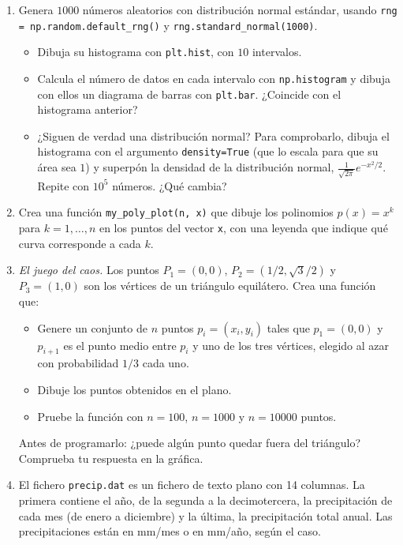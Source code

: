 \begin{enumerate}
\item Genera $1000$ números aleatorios con distribución normal estándar, usando \texttt{rng = np.random.default\_rng()} y \texttt{rng.standard\_normal(1000)}.
\begin{itemize}
    \item Dibuja su histograma con \texttt{plt.hist}, con $10$ intervalos.
    \item Calcula el número de datos en cada intervalo con \texttt{np.histogram} y dibuja con ellos un diagrama de barras con \texttt{plt.bar}. ¿Coincide con el histograma anterior?
    \item ¿Siguen de verdad una distribución normal? Para comprobarlo, dibuja el histograma con el argumento \texttt{density=True} (que lo escala para que su área sea $1$) y superpón la densidad de la distribución normal, $\frac{1}{\sqrt{2\pi}}e^{-x^2/2}$. Repite con $10^5$ números. ¿Qué cambia?
\end{itemize}

\item Crea una función \texttt{my\_poly\_plot(n, x)} que dibuje los polinomios $p(x)=x^k$ para $k=1,\ldots,n$ en los puntos del vector \texttt{x}, con una leyenda que indique qué curva corresponde a cada $k$.

\item \emph{El juego del caos.} Los puntos $P_1=(0,0)$, $P_2=(1/2,\sqrt{3}/2)$ y $P_3=(1,0)$ son los vértices de un triángulo equilátero. Crea una función que:
\begin{itemize}
    \item Genere un conjunto de $n$ puntos $p_i=(x_i,y_i)$ tales que $p_1=(0,0)$ y $p_{i+1}$ es el punto medio entre $p_i$ y uno de los tres vértices, elegido al azar con probabilidad $1/3$ cada uno.
    \item Dibuje los puntos obtenidos en el plano.
    \item Pruebe la función con $n=100$, $n=1000$ y $n=10000$ puntos.
\end{itemize}
Antes de programarlo: ¿puede algún punto quedar fuera del triángulo? Comprueba tu respuesta en la gráfica.

\item\label{ej:precip} El fichero \texttt{precip.dat} es un fichero de texto plano con 14 columnas. La primera contiene el año, de la segunda a la decimotercera, la precipitación de cada mes (de enero a diciembre) y la última, la precipitación total anual. Las precipitaciones están en mm/mes o en mm/año, según el caso.


\end{enumerate}
